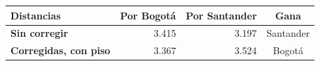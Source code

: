 \renewcommand{\arraystretch}{1.2}
\begin{tabular}{|l|r|r|c|}
\hline
\rowcolor{gray!20} \textbf{Distancias} & \textbf{Por Bogotá} & \textbf{Por Santander} & \textbf{Gana} \\
\hline
\textbf{Sin corregir} & 3.415 & 3.197 & Santander \\
\hline
\textbf{Corregidas, con piso} & 3.367 & 3.524 & Bogotá \\
\hline
\end{tabular}
